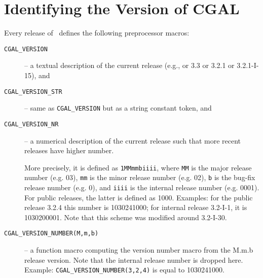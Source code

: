 
\section{Identifying the Version of CGAL\label{sec:cgal_version}}


Every release of \cgal\ defines the following preprocessor macros:
\begin{description}
\item[\texttt{CGAL\_VERSION}]
     -- a textual description of the current release
        (e.g., or 3.3 or 3.2.1 or 3.2.1-I-15), and 
\item[\texttt{CGAL\_VERSION\_STR}]
     -- same as \texttt{CGAL\_VERSION} but as a string constant token, and
\item[\texttt{CGAL\_VERSION\_NR}]
     -- a numerical description of the current release such that
        more recent releases have higher number.

     More precisely, it is defined as \texttt{1MMmmbiiii},
     where \texttt{MM} is the major release number (e.g. 03),
     \texttt{mm} is the minor release number (e.g. 02),
     \texttt{b} is the bug-fix release number (e.g. 0), and
     \texttt{iiii} is the internal release number (e.g. 0001). For
     public releases, the latter is defined as 1000.
     Examples: for the public release 3.2.4 this number is 
     1030241000; for internal release 3.2-I-1, it is 1030200001.
     Note that this scheme was modified around 3.2-I-30.
\item[\texttt{CGAL\_VERSION\_NUMBER(M,m,b)}]
     -- a function macro computing the version number macro
     from the M.m.b release version.  Note that the internal release
     number is dropped here.  Example: \texttt{CGAL\_VERSION\_NUMBER(3,2,4)}
     is equal to 1030241000.
\end{description}
 

